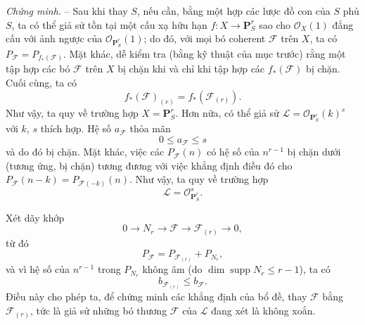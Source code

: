 \emph{Chứng minh.} -- Sau khi thay $S$, nếu cần, bằng một hợp các lược đồ con
của $S$ phủ $S$, ta có thể giả sử tồn tại một cấu xạ hữu hạn
$f:X\longrightarrow\mathbf P^r_S$ sao cho $\mathcal O_X(1)$ đẳng cấu với ảnh
ngược của $\mathcal O_{\mathbf P^r_S}(1)$; do đó, với mọi bó coherent
$\mathcal F$ trên $X$, ta có
$P_{\mathcal F}=P_{f_*(\mathcal F)}$. Mặt khác, dễ kiểm tra (bằng kỹ thuật của
mục trước) rằng một tập hợp các bó $\mathcal F$ trên $X$ bị chặn khi và chỉ khi
tập hợp các $f_*(\mathcal F)$ bị chặn. Cuối cùng, ta có
\[
f_*(\mathcal F)_{(r)}=f_*(\mathcal F_{(r)}).
\]
Như vậy, ta quy về trường hợp $X=\mathbf P^r_S$. Hơn nữa, có thể giả sử
$\mathcal L=\mathcal O_{\mathbf P^r_S}(k)^s$ với $k$, $s$ thích hợp. Hệ số
$a_{\mathcal F}$ thỏa mãn
\[
0\leq a_{\mathcal F}\leq s
\]
và do đó bị chặn. Mặt khác, việc các $P_{\mathcal F}(n)$ có hệ số của
$n^{r-1}$ bị chặn dưới (tương ứng, bị chặn) tương đương với việc khẳng định
điều đó cho
$P_{\mathcal F}(n-k)=P_{\mathcal F(-k)}(n)$. Như vậy, ta quy về trường hợp
\[
\mathcal L=\mathcal O_{\mathbf P^r_S}^{s}.
\]

Xét dãy khớp
\[
0\longrightarrow N_r\longrightarrow\mathcal F
\longrightarrow\mathcal F_{(r)}\longrightarrow0,
\]
từ đó
\[
P_{\mathcal F}=P_{\mathcal F_{(r)}}+P_{N_r},
\]
và vì hệ số của $n^{r-1}$ trong $P_{N_r}$ không âm (do
$\dim\operatorname{supp}N_r\leq r-1$), ta có
\[
b_{\mathcal F_{(r)}}\leq b_{\mathcal F}.
\]
Điều này cho phép ta, để chứng minh các khẳng định của bổ đề, thay
$\mathcal F$ bằng $\mathcal F_{(r)}$, tức là giả sử những bó thương
$\mathcal F$ của $\mathcal L$ đang xét là không xoắn.

